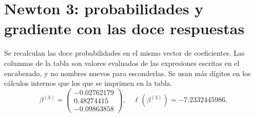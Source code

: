 \documentclass[11pt,a4paper]{article}
\begin{document}
\clearpage
\section{Newton 3: probabilidades y gradiente con las doce respuestas}\label{logit102}
Se recalculan las doce probabilidades en el mismo vector
de coeficientes. Las columnas de la tabla son valores evaluados
de las expresiones escritas en el encabezado, y no nombres nuevos
para esconderlas. Se usan más dígitos en los cálculos internos
que los que se imprimen en la tabla.
\[
\beta^{(3)}=\begin{pmatrix}-0.02762179\\0.48274415\\-0.09863858\end{pmatrix},\quad \ell(\beta^{(3)})=-7.2332445986.
\]
\end{document}
